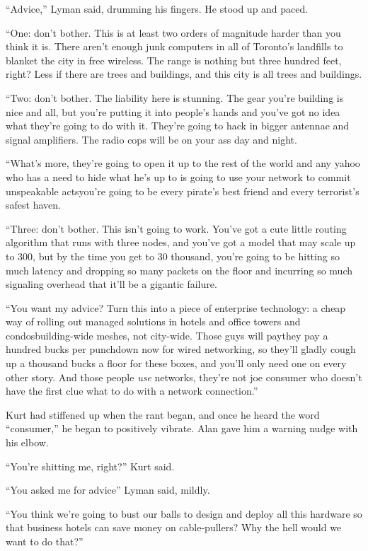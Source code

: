 ``Advice,'' Lyman said, drumming his fingers.  He stood up and paced.

``One:  don't bother.  This is at least two orders of magnitude harder
than you think it is.  There aren't enough junk computers in all of
Toronto's landfills to blanket the city in free wireless.  The range
is nothing but three hundred feet, right?  Less if there are trees and
buildings, and this city is all trees and buildings.

``Two:  don't bother.  The liability here is stunning.  The gear
you're building is nice and all, but you're putting it into people's
hands and you've got no idea what they're going to do with it. 
They're going to hack in bigger antennae and signal amplifiers.  The
radio cops will be on your ass day and night.

``What's more, they're going to open it up to the rest of the world
and any yahoo who has a need to hide what he's up to is going to use
your network to commit unspeakable acts\dash{}you're going to be every
pirate's best friend and every terrorist's safest haven.

``Three:  don't bother.  This isn't going to work.  You've got a cute
little routing algorithm that runs with three nodes, and you've got a
model that may scale up to 300, but by the time you get to 30
thousand, you're going to be hitting so much latency and dropping so
many packets on the floor and incurring so much signaling overhead
that it'll be a gigantic failure.

``You want my advice?  Turn this into a piece of enterprise
technology:  a cheap way of rolling out managed solutions in hotels
and office towers and condos\dash{}building-wide meshes, not city-wide. 
Those guys will pay\dash{}they pay a hundred bucks per punchdown now for
wired networking, so they'll gladly cough up a thousand bucks a floor
for these boxes, and you'll only need one on every other story.  And
those people \textit{use} networks, they're not joe consumer who
doesn't have the first clue what to do with a network connection.''

Kurt had stiffened up when the rant began, and once he heard the word
``consumer,'' he began to positively vibrate.  Alan gave him a warning
nudge with his elbow.

``You're shitting me, right?'' Kurt said.

``You asked me for advice\dash{}'' Lyman said, mildly.

``You think we're going to bust our balls to design and deploy all
this hardware so that business hotels can save money on cable-pullers? 
Why the hell would we want to do that?''

